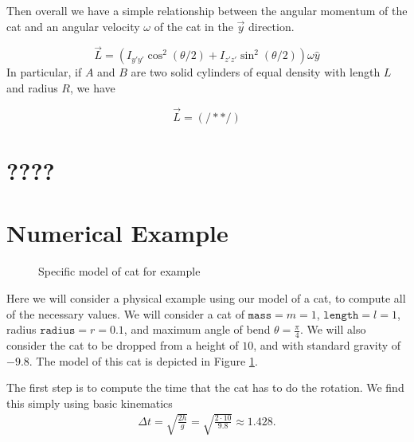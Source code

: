 \documentclass[12]{amsart}
\theoremstyle{definition}
\begin{document}
Then overall we have a simple relationship between the angular momentum of the cat and an angular velocity $\omega$ of the cat in the $\vec{y}$ direction.

\begin{equation}
  \vec{L} = (I_{y'y'} \cos^2(\theta/2) + I_{z'z'} \sin^2(\theta/2))\omega \hat{y}
\end{equation}
In particular, if $A$ and $B$ are two solid cylinders of equal density with length $L$ and radius $R$, we have

\begin{equation}
  \vec{L} = (/**/)
\end{equation}

\section{????}

\section{Numerical Example}%
\label{sec:numerical_example}

\begin{figure}[htpb]
  \centering
  
  \caption{Specific model of cat for example}%
  \label{fig:example_cat}
\end{figure}

Here we will consider a physical example using our model of a cat, to compute
all of the necessary values. We will consider a cat of $\mathtt{mass}=m=1$,
$\mathtt{length}=l=1$, radius $\mathtt{radius}=r=0.1$, and maximum angle of
bend $\theta=\frac{\pi}{4}$. We will also consider the cat to be dropped from a
height of $10$, and with standard gravity of $-9.8$. The model of this cat is
depicted in Figure \ref{fig:example_cat}.

The first step is to compute the time that the cat has to do the rotation. We
find this simply using basic kinematics
\begin{align*}
  \Delta t = \sqrt{\frac{2h}{g}}=\sqrt{\frac{2\cdot 10}{9.8}}\approx 1.428.
\end{align*}
\end{document}
